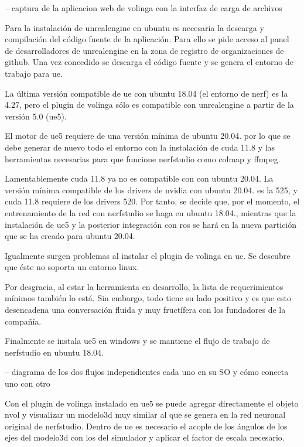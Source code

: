 \documentclass[a4paper, 12pt, spanish, twoside]{article}
\begin{document}
-- captura de la aplicacion web de volinga con la interfaz de carga de archivos  

Para la instalación de \gls{unrealengine} en \gls{ubuntu} es necesaria la descarga y compilación del código fuente de la aplicación. Para ello se pide acceso al panel de desarrolladores de \gls{unrealengine} en la zona de registro de organizaciones de \gls{github}. Una vez concedido se descarga el código fuente y se genera el entorno de trabajo para \acrshort{ue}. 

La última versión compatible de \acrshort{ue} con \gls{ubuntu} 18.04 (el entorno de \acrshort{nerf}) es la 4.27, pero el \gls{plugin} de \gls{volinga} sólo es compatible con \gls{unrealengine} a partir de la versión 5.0 (\acrshort{ue}5). 

El motor de \acrshort{ue}5 requiere de una versión mínima de \gls{ubuntu} 20.04. por lo que se debe generar de nuevo todo el entorno con la instalación de \acrshort{cuda} 11.8 y las herramientas necesarias para que funcione \gls{nerfstudio} como \gls{colmap} y \gls{ffmpeg}. 

Lamentablemente \acrshort{cuda} 11.8 ya no es compatible con con \gls{ubuntu} 20.04. La versión mínima compatible de los drivers de \gls{nvidia} con \gls{ubuntu} 20.04. es la 525, y \acrshort{cuda} 11.8 requiere de los drivers 520. Por tanto, se decide que, por el momento, el entrenamiento de la red con \gls{nerfstudio} se haga en \gls{ubuntu} 18.04., mientras que la instalación de \acrshort{ue}5 y la posterior integración con \acrshort{ros} se hará en la nueva partición que se ha creado para \gls{ubuntu} 20.04. 

Igualmente surgen problemas al instalar el \gls{plugin} de \gls{volinga} en \acrshort{ue}. Se descubre que éste no soporta un entorno \gls{linux}. 

Por desgracia, al estar la herramienta en desarrollo, la lista de requerimientos mínimos también lo está. Sin embargo, todo tiene su lado positivo y es que esto desencadena una conversación fluida y muy fructífera con los fundadores de la compañía. 

Finalmente se instala \acrshort{ue}5 en \gls{windows} y se mantiene el flujo de trabajo de \gls{nerfstudio} en \gls{ubuntu} 18.04. 

-- diagrama de los dos flujos independientes cada uno en su SO y cómo conecta uno con otro 

Con el \gls{plugin} de \gls{volinga} instalado en \acrshort{ue}5 se puede agregar directamente el objeto \gls{nvol} y visualizar un \gls{modelo3d} muy similar al que se genera en la red neuronal original de \gls{nerfstudio}. Dentro de \acrshort{ue} es necesario el acople de los ángulos de los ejes del \gls{modelo3d} con los del simulador y aplicar el factor de escala necesario.  
\end{document}
